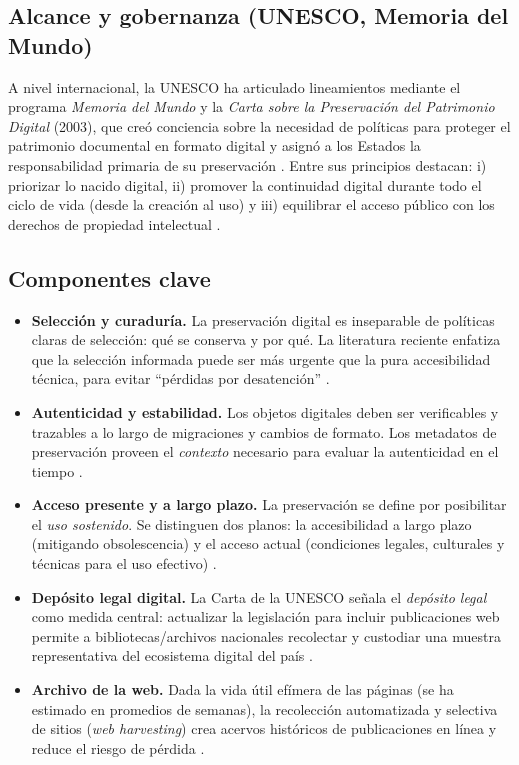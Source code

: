 \subsection*{Alcance y gobernanza (UNESCO, Memoria del Mundo)}
A nivel internacional, la UNESCO ha articulado lineamientos mediante el programa \emph{Memoria del Mundo} y la \textit{Carta sobre la Preservación del Patrimonio Digital} (2003), que creó conciencia sobre la necesidad de políticas para proteger el patrimonio documental en formato digital y asignó a los Estados la responsabilidad primaria de su preservación \cite{Pabon2017,UNESCO2003Charter}. Entre sus principios destacan: i) priorizar lo nacido digital, ii) promover la continuidad digital durante todo el ciclo de vida (desde la creación al uso) y iii) equilibrar el acceso público con los derechos de propiedad intelectual \cite{UNESCO2003Charter}.

\subsection*{Componentes clave}
\begin{itemize}
  \item \textbf{Selección y curaduría.} La preservación digital es inseparable de políticas claras de selección: qué se conserva y por qué. La literatura reciente enfatiza que la selección informada puede ser más urgente que la pura accesibilidad técnica, para evitar “pérdidas por desatención” \cite{Pabon2017}.
  \item \textbf{Autenticidad y estabilidad.} Los objetos digitales deben ser verificables y trazables a lo largo de migraciones y cambios de formato. Los metadatos de preservación proveen el \emph{contexto} necesario para evaluar la autenticidad en el tiempo \cite{Pabon2017,UNESCO2003Charter}.
  \item \textbf{Acceso presente y a largo plazo.} La preservación se define por posibilitar el \emph{uso sostenido}. Se distinguen dos planos: la accesibilidad a largo plazo (mitigando obsolescencia) y el acceso actual (condiciones legales, culturales y técnicas para el uso efectivo) \cite{Pabon2017}.
  \item \textbf{Depósito legal digital.} La Carta de la UNESCO señala el \emph{depósito legal} como medida central: actualizar la legislación para incluir publicaciones web permite a bibliotecas/archivos nacionales recolectar y custodiar una muestra representativa del ecosistema digital del país \cite{Pabon2017,UNESCO2003Charter}.
  \item \textbf{Archivo de la web.} Dada la vida útil efímera de las páginas (se ha estimado en promedios de semanas), la recolección automatizada y selectiva de sitios (\emph{web harvesting}) crea acervos históricos de publicaciones en línea y reduce el riesgo de pérdida \cite{Pabon2017}.
\end{itemize}

